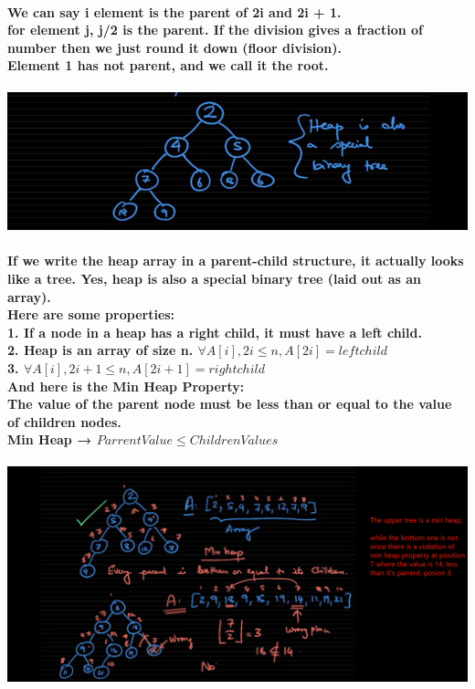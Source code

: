 \documentclass{article}
\begin{document}
\paragraph{We can say i element is the parent of 2i and 2i + 1.\\
for element j, j/2 is the parent. If the division gives a fraction of number then we just round it down (floor division).\\
Element 1 has not parent, and we call it the root.\\}

\includegraphics[width=\textwidth]{heapbinarytree}



\paragraph{If we write the heap array in a parent-child structure, it actually looks like a tree. Yes, heap is also a special binary tree (laid out as an array).\\
Here are some properties:\\
1. If a node in a heap has a right child, it must have a left child.\\
2. Heap is an array of size n. $\forall A[i],2i \leq n,A[2i] = leftchild$\\
3. $\forall A[i],2i+1 \leq n,A[2i+1] = rightchild$\\
And here is the Min Heap Property:\\
The value of the parent node must be less than or equal to the value of children nodes.\\
Min Heap → $ParrentValue \leq ChildrenValues$\\}


\includegraphics[width=\textwidth]{minheap}
\end{document}
